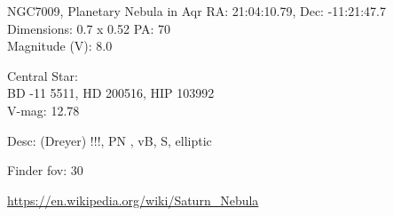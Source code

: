 \begin{block}{NGC7009, Planetary Nebula in Aqr}
    RA: 21:04:10.79, Dec: -11:21:47.7 \\ 
    Dimensions: 0.7 x 0.52 PA: 70 \\ 
    Magnitude (V): 8.0

    Central Star: \\ 
      \hspace{1em}BD -11 5511, HD 200516, HIP 103992 \\ 
      \hspace{1em}V-mag: 12.78 

    Desc: (Dreyer) !!!, PN , vB, S, elliptic 

    Finder fov: 30 

    \url{https://en.wikipedia.org/wiki/Saturn_Nebula} 
\end{block}
